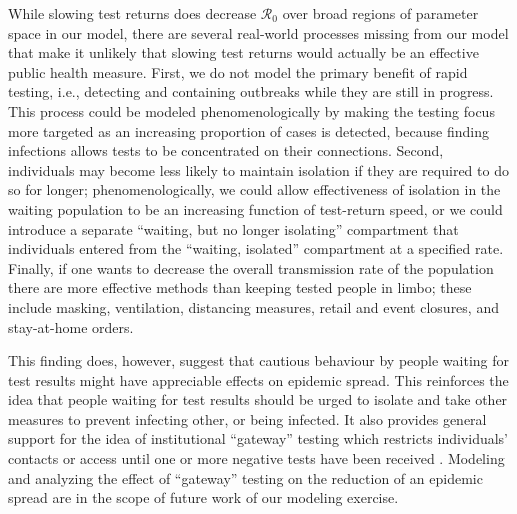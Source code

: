 \documentclass[smallextended]{svjour3}       %
\newcommand{\Rnum}{\ensuremath{\mathcal{R}_0}\xspace}
\DeclareRobustCommand\_{\ifmmode\expandafter\subtxt\else\textunderscore\fi}
\begin{document}
While slowing test returns does decrease $\Rnum$ over broad regions of parameter space in our model, there are several real-world processes missing from our model that make it unlikely that slowing test returns would actually be an effective public health measure. First, we do not model the primary benefit of rapid testing, i.e., detecting and containing outbreaks while they are still in progress. This process could be modeled phenomenologically by making the testing focus more targeted as an increasing proportion of cases is detected, because finding infections allows tests to be concentrated on their connections. Second, individuals may become less likely to maintain isolation if they are required to do so for longer; phenomenologically, we could allow  effectiveness of isolation in the waiting population to be an increasing function of test-return speed, or we could introduce a separate ``waiting, but no longer isolating'' compartment that individuals entered from the ``waiting, isolated'' compartment at a specified rate. Finally, if one wants to decrease the overall transmission rate of the population there are more effective methods than keeping tested people in limbo; these include masking, ventilation, distancing measures, retail and event closures, and stay-at-home orders.

This finding does, however, suggest that cautious behaviour by people waiting for test results might have appreciable effects on epidemic spread. This reinforces the idea that people waiting for test results should be urged to isolate and take other measures to prevent infecting other, or being infected. It also provides general support for the idea of institutional ``gateway'' testing which restricts individuals' contacts or access until one or more negative tests have been received \citep{muller2021mathematical}. Modeling and analyzing the effect of ``gateway'' testing on the reduction of an epidemic spread are in the scope of future work of our modeling exercise.%
\end{document}
